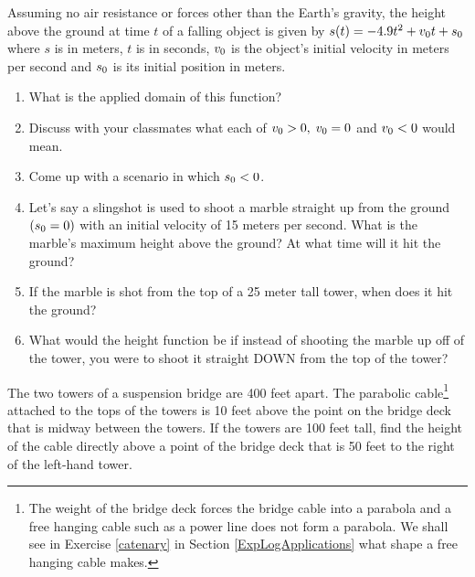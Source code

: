 \begin{exenum}
\item Assuming no air resistance or forces other than the Earth's gravity, the height above the ground at time $t$ of a falling object is given by $s(t) = -4.9t^{2} + v_{\mbox{\scriptsize $0$}}t + s_{\mbox{\scriptsize $0$}}$ where $s$ is in meters, $t$ is in seconds, $v_{\mbox{\scriptsize $0$}}$ is the object's initial velocity in meters per second and $s_{\mbox{\scriptsize $0$}}$ is its initial position in meters.  
\label{whatgoesup}

\begin{enumerate}

\item What is the applied domain of this function?
\item Discuss with your classmates what each of $v_{\mbox{\scriptsize $0$}} > 0, \; v_{\mbox{\scriptsize $0$}} = 0$ and $v_{\mbox{\scriptsize $0$}} < 0$ would mean.
\item Come up with a scenario in which $s_{\mbox{\scriptsize $0$}} < 0$.
\item Let's say a slingshot is used to shoot a marble straight up from the ground $(s_{\mbox{\scriptsize $0$}} = 0)$ with an initial velocity of 15 meters per second.  What is the marble's maximum height above the ground?  At what time will it hit the ground?
\item If the marble is shot from the top of a 25 meter tall tower,  when does it hit the ground?
\item What would the height function be if instead of shooting the marble up off of the tower, you were to shoot it straight DOWN from the top of the tower?

\end{enumerate}

\item \label{parabolicbridgecable} The two towers of a suspension bridge are 400 feet apart.  The parabolic cable\footnote{The weight of the bridge deck forces the bridge cable into a parabola and a free hanging cable such as a power line does not form a parabola.  We shall see in Exercise \ref{catenary} in Section \ref{ExpLogApplications} what shape a free hanging cable makes.} attached to the tops of the towers is 10 feet above the point on the bridge deck that is midway between the towers.  If the towers are 100 feet tall, find the height of the cable directly above a point of the bridge deck that is 50 feet to the right of the left-hand tower.


\end{exenum}
